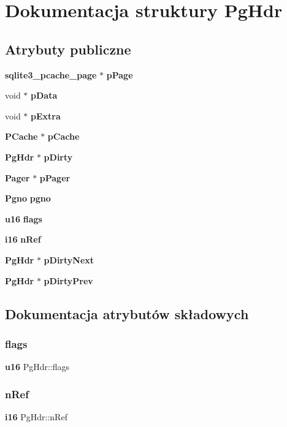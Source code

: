 \section{Dokumentacja struktury Pg\+Hdr}
\label{struct_pg_hdr}
\subsection*{Atrybuty publiczne}
\begin{DoxyCompactItemize}
\item 
\textbf{ sqlite3\+\_\+pcache\+\_\+page} $\ast$ \textbf{ p\+Page}
\item 
void $\ast$ \textbf{ p\+Data}
\item 
void $\ast$ \textbf{ p\+Extra}
\item 
\textbf{ P\+Cache} $\ast$ \textbf{ p\+Cache}
\item 
\textbf{ Pg\+Hdr} $\ast$ \textbf{ p\+Dirty}
\item 
\textbf{ Pager} $\ast$ \textbf{ p\+Pager}
\item 
\textbf{ Pgno} \textbf{ pgno}
\item 
\textbf{ u16} \textbf{ flags}
\item 
\textbf{ i16} \textbf{ n\+Ref}
\item 
\textbf{ Pg\+Hdr} $\ast$ \textbf{ p\+Dirty\+Next}
\item 
\textbf{ Pg\+Hdr} $\ast$ \textbf{ p\+Dirty\+Prev}
\end{DoxyCompactItemize}


\subsection{Dokumentacja atrybutów składowych}
\mbox{\label{struct_pg_hdr_a8ef58380f7e04f1e3c76fa208e227f95}} 
\subsubsection{flags}
{\footnotesize\ttfamily \textbf{ u16} Pg\+Hdr\+::flags}

\mbox{\label{struct_pg_hdr_ac68c685d117788c18849e8853dd419d5}} 
\subsubsection{nRef}
{\footnotesize\ttfamily \textbf{ i16} Pg\+Hdr\+::n\+Ref}

